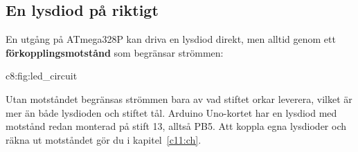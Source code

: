 \subsection{En lysdiod på riktigt}
\label{c8:c8}
En utgång på ATmega328P kan driva en lysdiod direkt, men alltid genom ett
\textbf{förkopplingsmotstånd} som begränsar strömmen:

  {c8:fig:led_circuit}

Utan motståndet begränsas strömmen bara av vad stiftet orkar leverera, vilket är mer än både
lysdioden och stiftet tål. Arduino Uno-kortet har en lysdiod med motstånd redan monterad på stift
13, alltså PB5. Att koppla egna lysdioder och räkna ut motståndet gör du i kapitel~\ref{c11:ch}.
